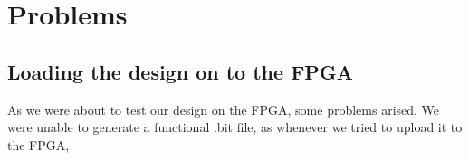 \section{Problems}

\subsection{Loading the design on to the FPGA}
\label{subsec:uploadproblems}

As we were about to test our design on the FPGA, some problems arised. We were
unable to generate a functional .bit file, as whenever we tried to upload it to
the FPGA, 

